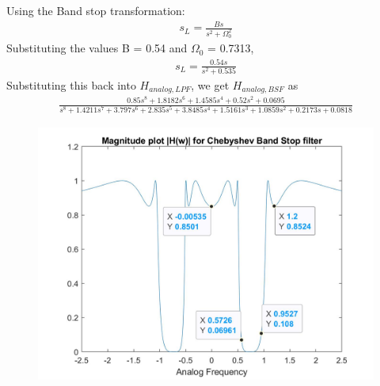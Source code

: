 \documentclass[12pt]{article}
\begin{document}
	Using the Band stop transformation:
	\begin{gather*}
		s_L = \frac{Bs}{s^2 + \Omega_0^2}
	\end{gather*}
	Substituting the values B = 0.54 and $\Omega_0$ = 0.7313,
	\begin{gather*}
		s_L = \frac{0.54s}{s^2 + 0.535}
	\end{gather*}
	Substituting this back into $H_{analog,LPF}$, we get $H_{analog,BSF}$ as
	\begin{gather*}
		\frac{0.85s^8 + 1.8182s^6 + 1.4585s^4 + 0.52s^2 + 0.0695}{s^8 + 1.4211s^7 + 3.797s^6 + 2.835s^5 + 3.8485s^4 + 1.5161s^3 + 1.0859s^2 + 0.2173s + 0.0818}	
	\end{gather*}
	\begin{figure}[H]
		\centering
		\includegraphics[width = 12cm, trim=1cm 0cm 1cm 0cm, clip]{Filter2ABSF.jpg}
	\end{figure}

	\color{cyan}
\end{document}
